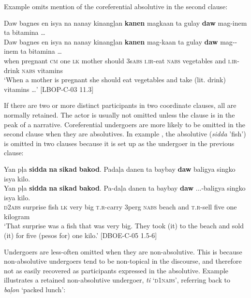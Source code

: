 Example  omits mention of the coreferential absolutive in the second clause:

\ea
\label{ex:drinkvitamins}
Daw bagnes en isya na nanay kinang\c{l}an \textbf{kanen} magkaan ta gulay \textbf{daw} mag-inem ta bitamina … \\
\vspace{4pt} \gll Daw bagnes en isya na nanay kinang\c{l}an \textbf{kanen} mag-kaan ta gulay \textbf{daw} mag-{}-inem ta bitamina … \\
when pregnant \textsc{cm} one \textsc{lk} mother should 3s\textsc{abs} \textsc{i.ir}-eat \textsc{nabs} vegetables and \textsc{i.ir}-drink \textsc{nabs} vitamins \\
\glt ‘When a mother is pregnant she should eat vegetables and take (lit. drink) vitamins …’ [LBOP-C-03 11.3]
\z

If there are two or more distinct participants in two coordinate clauses, all are normally retained. The actor is usually not omitted unless the clause is in the peak of a narrative. Coreferential undergoers are more likely to be omitted in the second clause when they are absolutives. In example , the absolutive (\textit{sidda} 'fish') is omitted in two clauses because it is set up as the undergoer in the previous clause:

\ea
\label{ex:onekilo}
Yan p\c{l}a \textbf{sidda} \textbf{na} \textbf{sikad} \textbf{bakod}. Pada\c{l}a danen ta baybay \textbf{daw} baligya singko isya kilo. \\
\vspace{4pt} \gll Yan p\c{l}a \textbf{sidda} \textbf{na} \textbf{sikad} \textbf{bakod}. Pa-da\c{l}a danen ta baybay \textbf{daw} ...-baligya singko isya kilo. \\
\textsc{d2abs} surprise fish \textsc{lk} very big \textsc{t.r}-carry 3p{erg} \textsc{nabs} beach and \textsc{t.r}-sell five one kilogram \\
\glt ‘That surprise was a fish that was very big. They took (it) to the beach and sold (it) for five (pesos for) one kilo.’ [DBOE-C-05 1.5-6]
\z

Undergoers are less-often omitted when they are non-absolutive. This is because non-absolutive undergoers tend to be non-topical in the discourse, and therefore not as easily recovered as participants expressed in the absolutive. Example  illustrates a retained non-absolutive undergoer, \textit{ti} `\textsc{d1nabs}', referring back to  \textit{ba\c{l}on} `packed lunch':

